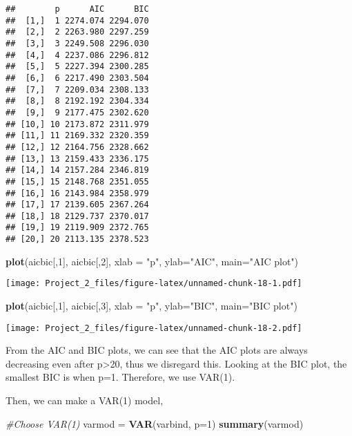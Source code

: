 \documentclass[]{article}
\newenvironment{Shaded}{\begin{snugshade}}{\end{snugshade}}
\newcommand{\KeywordTok}[1]{\textcolor[rgb]{0.13,0.29,0.53}{\textbf{#1}}}
\newcommand{\DataTypeTok}[1]{\textcolor[rgb]{0.13,0.29,0.53}{#1}}
\newcommand{\DecValTok}[1]{\textcolor[rgb]{0.00,0.00,0.81}{#1}}
\newcommand{\StringTok}[1]{\textcolor[rgb]{0.31,0.60,0.02}{#1}}
\newcommand{\CommentTok}[1]{\textcolor[rgb]{0.56,0.35,0.01}{\textit{#1}}}
\newcommand{\NormalTok}[1]{#1}
\begin{document}
\begin{verbatim}
##        p      AIC      BIC
##  [1,]  1 2274.074 2294.070
##  [2,]  2 2263.980 2297.259
##  [3,]  3 2249.508 2296.030
##  [4,]  4 2237.086 2296.812
##  [5,]  5 2227.394 2300.285
##  [6,]  6 2217.490 2303.504
##  [7,]  7 2209.034 2308.133
##  [8,]  8 2192.192 2304.334
##  [9,]  9 2177.475 2302.620
## [10,] 10 2173.872 2311.979
## [11,] 11 2169.332 2320.359
## [12,] 12 2164.756 2328.662
## [13,] 13 2159.433 2336.175
## [14,] 14 2157.284 2346.819
## [15,] 15 2148.768 2351.055
## [16,] 16 2143.984 2358.979
## [17,] 17 2139.605 2367.264
## [18,] 18 2129.737 2370.017
## [19,] 19 2119.909 2372.765
## [20,] 20 2113.135 2378.523
\end{verbatim}

\begin{Shaded}
\begin{Highlighting}[]
\KeywordTok{plot}\NormalTok{(aicbic[,}\DecValTok{1}\NormalTok{], aicbic[,}\DecValTok{2}\NormalTok{], }\DataTypeTok{xlab =} \StringTok{"p"}\NormalTok{, }\DataTypeTok{ylab=}\StringTok{"AIC"}\NormalTok{, }\DataTypeTok{main=}\StringTok{"AIC plot"}\NormalTok{)}
\end{Highlighting}
\end{Shaded}

\texttt{[image: Project\_2\_files/figure-latex/unnamed-chunk-18-1.pdf]}

\begin{Shaded}
\begin{Highlighting}[]
\KeywordTok{plot}\NormalTok{(aicbic[,}\DecValTok{1}\NormalTok{], aicbic[,}\DecValTok{3}\NormalTok{], }\DataTypeTok{xlab =} \StringTok{"p"}\NormalTok{, }\DataTypeTok{ylab=}\StringTok{"BIC"}\NormalTok{, }\DataTypeTok{main=}\StringTok{"BIC plot"}\NormalTok{)}
\end{Highlighting}
\end{Shaded}

\texttt{[image: Project\_2\_files/figure-latex/unnamed-chunk-18-2.pdf]}

From the AIC and BIC plots, we can see that the AIC plots are always
decreasing even after p\textgreater{}20, thus we disregard this. Looking
at the BIC plot, the smallest BIC is when p=1. Therefore, we use VAR(1).

Then, we can make a VAR(1) model,

\begin{Shaded}
\begin{Highlighting}[]
\CommentTok{#Choose VAR(1)}
\NormalTok{varmod =}\StringTok{ }\KeywordTok{VAR}\NormalTok{(varbind, }\DataTypeTok{p=}\DecValTok{1}\NormalTok{)}
\KeywordTok{summary}\NormalTok{(varmod)}
\end{Highlighting}
\end{Shaded}
\end{document}
